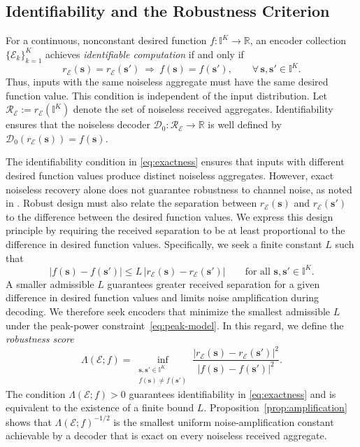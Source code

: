 \documentclass[journal,12pt,onecolumn,draftclsnofoot]{IEEEtran}
\newcommand{\enc}{\mathscr{E}}\newcommand{\dec}{\mathscr{D}}\newcommand{\R}{\mathbb R}\newcommand{\C}{\mathbb C}
\begin{document}
\subsection{Identifiability and the Robustness Criterion}


For a continuous, nonconstant desired function $f:\mathbb I^K\to\R$, an encoder collection $\{\mathscr{E}_k\}_{k=1}^K$ achieves \emph{identifiable computation} if and only if 
\begin{equation}
  r_\enc(\boldsymbol s) = r_\enc(\boldsymbol s') 
  \ \Longrightarrow\ 
  f(\boldsymbol s) = f(\boldsymbol s'), 
  \qquad \forall\,\boldsymbol s, \boldsymbol s' \in \mathbb I^K.
  \label{eq:exactness}
\end{equation}
Thus, inputs with the same noiseless aggregate must have the same
desired function value. This condition is independent of the input distribution. Let $\mathcal R_\enc:=r_\enc(\mathbb I^K)$ denote the set of noiseless received aggregates. Identifiability ensures that the noiseless decoder $\dec_0:\mathcal R_\enc\to\R$ is well defined by $\dec_0(r_\enc(\boldsymbol s))=f(\boldsymbol s)$.


The identifiability condition in \eqref{eq:exactness} ensures that inputs with different desired function values produce distinct noiseless aggregates. However, exact noiseless recovery alone does not guarantee robustness to channel noise, as noted in \cite{channelcomp2024}. Robust design must also relate the separation between $r_\enc(\boldsymbol s)$ and $r_\enc(\boldsymbol s')$ to the difference between the desired function values. We express this design principle by requiring the received separation to be
at least proportional to the difference in desired function values.
Specifically, we seek a finite constant $L$ such that
$$
|f(\boldsymbol s)-f(\boldsymbol s')|
\le L\,|r_\enc(\boldsymbol s)-r_\enc(\boldsymbol s')|
\qquad
\text{for all }\boldsymbol s,\boldsymbol s'\in\mathbb I^K.
$$
A smaller admissible $L$ guarantees greater received separation for a given
difference in desired function values and limits noise amplification during
decoding. We therefore seek encoders that minimize the smallest admissible
$L$ under the peak-power constraint~\eqref{eq:peak-model}. In this regard, we define the \emph{robustness score}
\begin{equation}
 \Lambda(\enc;f)
 =\inf_{\substack{\boldsymbol s,\boldsymbol s'\in\mathbb I^K\\
                  f(\boldsymbol s)\ne f(\boldsymbol s')}}
 \frac{|r_\enc(\boldsymbol s)-r_\enc(\boldsymbol s')|^2}
 {|f(\boldsymbol s)-f(\boldsymbol s')|^2}.
 \label{eq:score}
\end{equation}
The condition $\Lambda(\enc;f)>0$ guarantees identifiability in \eqref{eq:exactness} and is equivalent to the existence of a finite bound $L$. Proposition~\ref{prop:amplification} shows that
$\Lambda(\enc;f)^{-1/2}$ is the smallest uniform noise-amplification
constant achievable by a decoder that is exact on every noiseless received aggregate.
\end{document}
